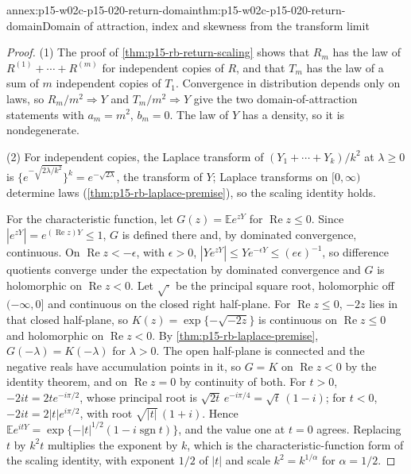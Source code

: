 \begin{annexitem}{annex:p15-w02c-p15-020-return-domain}{thm:p15-w02c-p15-020-return-domain}{Domain of attraction, index and skewness from the transform limit}
\begin{proof}
(1) The proof of \cref{thm:p15-rb-return-scaling} shows that \(R_m\) has
the law of \(R^{(1)}+\cdots+R^{(m)}\) for independent copies of \(R\),
and that \(T_m\) has the law of a sum of \(m\) independent copies of
\(T_1\). Convergence in distribution depends only on laws, so
\(R_m/m^2\Rightarrow Y\) and \(T_m/m^2\Rightarrow Y\) give the two
domain-of-attraction statements with \(a_m=m^2\), \(b_m=0\). The law of
\(Y\) has a density, so it is nondegenerate.

(2) For independent copies, the Laplace transform of
\((Y_1+\cdots+Y_k)/k^2\) at \(\lambda\geq0\) is
\(\{e^{-\sqrt{2\lambda/k^2}}\}^k=e^{-\sqrt{2\lambda}}\), the transform
of \(Y\); Laplace transforms on \([0,\infty)\) determine laws
(\cref{thm:p15-rb-laplace-premise}), so the scaling identity holds.

For the characteristic function, let
\(G(z)=\mathbb Ee^{zY}\) for \(\operatorname{Re}z\leq0\). Since
\(|e^{zY}|=e^{(\operatorname{Re}z)Y}\leq1\), \(G\) is defined there and,
by dominated convergence, continuous. On \(\operatorname{Re}z<-\epsilon\),
with \(\epsilon>0\), \(|Ye^{zY}|\leq Ye^{-\epsilon Y}\leq(e\epsilon)^{-1}\),
so difference quotients converge under the expectation by dominated
convergence and \(G\) is holomorphic on \(\operatorname{Re}z<0\).
Let \(\sqrt{\cdot}\) be the principal square root, holomorphic off
\((-\infty,0]\) and continuous on the closed right half-plane. For
\(\operatorname{Re}z\leq0\), \(-2z\) lies in that closed half-plane, so
\(K(z)=\exp\{-\sqrt{-2z}\}\) is continuous on \(\operatorname{Re}z\leq0\)
and holomorphic on \(\operatorname{Re}z<0\). By
\cref{thm:p15-rb-laplace-premise}, \(G(-\lambda)=K(-\lambda)\) for
\(\lambda>0\). The open half-plane is connected and the negative reals
have accumulation points in it, so \(G=K\) on \(\operatorname{Re}z<0\)
by the identity theorem, and on \(\operatorname{Re}z=0\) by continuity
of both. For \(t>0\), \(-2it=2te^{-i\pi/2}\), whose principal root is
\(\sqrt{2t}\,e^{-i\pi/4}=\sqrt t\,(1-i)\); for \(t<0\),
\(-2it=2|t|e^{i\pi/2}\), with root \(\sqrt{|t|}\,(1+i)\). Hence
\(\mathbb Ee^{itY}=\exp\{-|t|^{1/2}(1-i\operatorname{sgn}t)\}\), and the
value one at \(t=0\) agrees. Replacing \(t\) by \(k^2t\) multiplies the
exponent by \(k\), which is the characteristic-function form of the
scaling identity, with exponent \(1/2\) of \(|t|\) and scale
\(k^2=k^{1/\alpha}\) for \(\alpha=1/2\).


\end{proof}
\end{annexitem}
